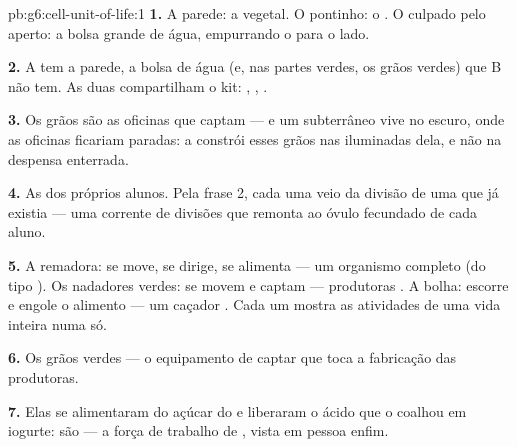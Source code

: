\begin{solution}{pb:g6:cell-unit-of-life:1}
\textbf{1.} A parede: a  vegetal. O pontinho: o .
O culpado pelo aperto: a bolsa grande de água, empurrando o 
para o lado.

\textbf{2.} A tem a parede, a bolsa de água (e, nas partes verdes, os
grãos verdes) que B não tem. As duas compartilham o kit: ,
, .

\textbf{3.} Os grãos são as oficinas que captam  --- e um 
subterrâneo vive no escuro, onde as oficinas ficariam paradas: a
 constrói esses grãos nas  iluminadas dela, e não na
despensa enterrada.

\textbf{4.} As  dos próprios alunos. Pela frase 2, cada uma
veio da divisão de uma  que já existia --- uma corrente de
divisões que remonta ao óvulo fecundado de cada aluno.

\textbf{5.} A remadora: se move, se dirige, se alimenta --- um
organismo  completo (do tipo ). Os nadadores verdes:
se movem e captam  --- produtoras . A bolha: escorre e
engole o alimento --- um caçador . Cada um mostra as
atividades de uma vida inteira numa  só.

\textbf{6.} Os grãos verdes --- o equipamento de captar  que toca a
fabricação das produtoras.

\textbf{7.} Elas se alimentaram do açúcar do  e liberaram o ácido
que o coalhou em iogurte: são   --- a força de
trabalho de , vista em pessoa enfim.


\end{solution}
